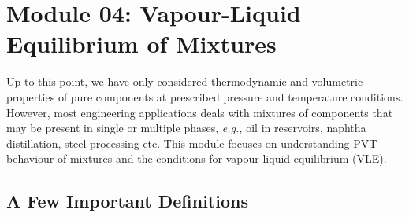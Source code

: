 \documentclass[12pts,a4paper,amsmath,amssymb,floatfix]{article}%
\newcommand{\eg}{{\it e.g., }}
\begin{document}
\clearpage

\section{Module 04: Vapour-Liquid Equilibrium of Mixtures}\label{Section:04}

Up to this point, we have only considered thermodynamic and volumetric properties of pure components at prescribed pressure and temperature conditions. However, most engineering applications deals with mixtures of components that may be present in single or multiple phases, \eg oil in reservoirs, naphtha distillation, steel processing etc. This module focuses on understanding PVT behaviour of mixtures and the conditions for vapour-liquid equilibrium (VLE).


\subsection{A Few Important Definitions}


\end{document}
